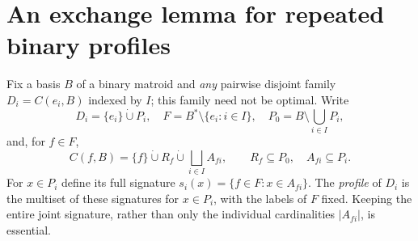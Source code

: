 \documentclass[11pt]{article}
\begin{document}
\section{An exchange lemma for repeated binary profiles}\label{sec:exchange}
Fix a basis $B$ of a binary matroid and \emph{any} pairwise disjoint
family $D_i=C(e_i,B)$ indexed by $I$; this family need not be optimal.
Write
\[
 D_i=\{e_i\}\mathbin{\dot\cup}P_i,\quad
 F=B^*\setminus\{e_i:i\in I\},\quad
 P_0=B\setminus\bigcup_{i\in I}P_i,
\]
and, for $f\in F$,
\[
 C(f,B)=\{f\}\mathbin{\dot\cup}R_f
             \mathbin{\dot\cup}\bigsqcup_{i\in I}A_{fi},
 \qquad R_f\subseteq P_0,\quad A_{fi}\subseteq P_i.
\]
For $x\in P_i$ define its full signature
$s_i(x)=\{f\in F:x\in A_{fi}\}$.  The \emph{profile} of $D_i$ is the
multiset of these signatures for $x\in P_i$, with the labels of $F$
fixed.  Keeping the entire joint signature, rather than only the
individual cardinalities $|A_{fi}|$, is essential.
\end{document}

